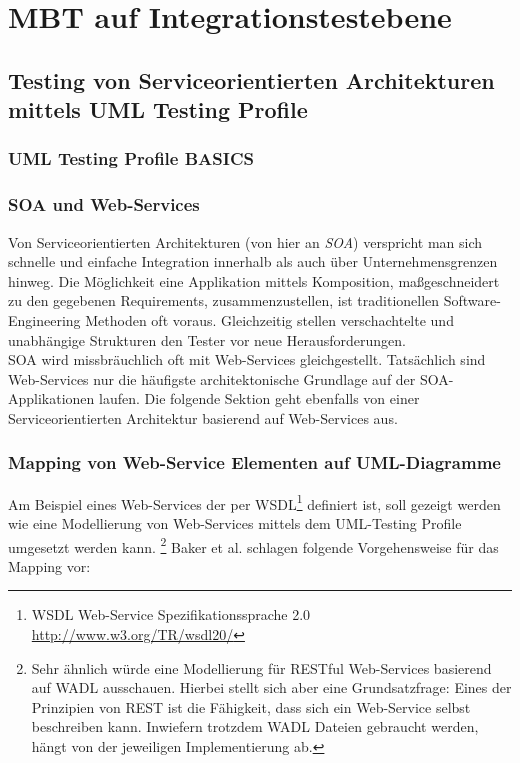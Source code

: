 \section{MBT auf Integrationstestebene}
\subsection{Testing von Serviceorientierten Architekturen mittels UML Testing Profile}
\label{sec:utp}
\subsubsection{UML Testing Profile BASICS}

\subsubsection{SOA und Web-Services}
Von Serviceorientierten Architekturen (von hier an \textit{SOA}) verspricht man sich schnelle und einfache Integration innerhalb als auch über Unternehmensgrenzen hinweg. Die Möglichkeit eine Applikation mittels Komposition, maßgeschneidert zu den gegebenen Requirements, zusammenzustellen, ist traditionellen Software-Engineering Methoden oft voraus. Gleichzeitig stellen verschachtelte und unabhängige Strukturen den Tester vor neue Herausforderungen. \\
SOA wird missbräuchlich oft mit Web-Services gleichgestellt. Tatsächlich sind Web-Services nur die häufigste architektonische Grundlage auf der SOA-Applikationen laufen. Die folgende Sektion geht ebenfalls von einer Serviceorientierten Architektur basierend auf Web-Services aus.

\subsubsection{Mapping von Web-Service Elementen auf UML-Diagramme}
Am Beispiel eines Web-Services der per WSDL\footnote{WSDL Web-Service Spezifikationssprache 2.0 \url{http://www.w3.org/TR/wsdl20/}} definiert ist, soll gezeigt werden wie eine Modellierung von Web-Services mittels dem UML-Testing Profile umgesetzt werden kann. \footnote{Sehr ähnlich würde eine Modellierung für RESTful Web-Services basierend auf WADL ausschauen. Hierbei stellt sich aber eine Grundsatzfrage: Eines der Prinzipien von REST ist die Fähigkeit, dass sich ein Web-Service selbst beschreiben kann. Inwiefern trotzdem WADL Dateien gebraucht werden, hängt von der jeweiligen Implementierung ab.} Baker et al.  schlagen folgende Vorgehensweise für das Mapping vor\cite{_model-driven_2007}:

